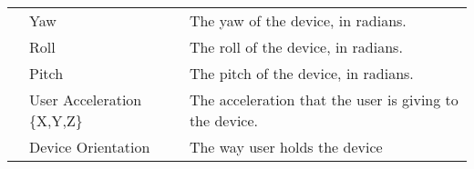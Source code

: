 \begin{table*}[h]
\begin{tabular}{|l|p{3.5cm}|p{10.5cm}|}
                                & Yaw                            & The yaw of the device, in radians.                                                                         \\ \cline{2-3} 
                                & Roll                           & The roll of the device, in radians.                                                                        \\ \cline{2-3} 
                                & Pitch                          & The pitch of the device, in radians.                                                                       \\ \cline{2-3} 
                                & User Acceleration \{X,Y,Z\}    & The acceleration that the user is giving to the device.                                                    \\ \cline{2-3} 
                                & Device Orientation             & The way user holds the device                                                                              \\ \hline
\end{tabular}
\end{table*}
